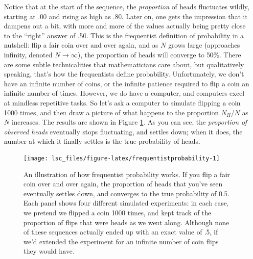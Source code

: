 \documentclass[
  11pt,
  a4paper,
  twoside,symmetric,openright]{book}
\theoremstyle{break}
\theoremstyle{break}
\begin{document}
Notice that at the start of the sequence, the \emph{proportion} of heads fluctuates wildly, starting at .00 and rising as high as .80. Later on, one gets the impression that it dampens out a bit, with more and more of the values actually being pretty close to the ``right'' answer of .50. This is the frequentist definition of probability in a nutshell: flip a fair coin over and over again, and as \(N\) grows large (approaches infinity, denoted \(N\rightarrow \infty\)), the proportion of heads will converge to 50\%. There are some subtle technicalities that mathematicians care about, but qualitatively speaking, that's how the frequentists define probability. Unfortunately, we don't have an infinite number of coins, or the infinite patience required to flip a coin an infinite number of times. However, we do have a computer, and computers excel at mindless repetitive tasks. So let's ask a computer to simulate flipping a coin 1000 times, and then draw a picture of what happens to the proportion \(N_H / N\) as \(N\) increases. The results are shown in Figure \ref{fig:frequentistprobability}. As you can see, the \emph{proportion of observed heads} eventually stops fluctuating, and settles down; when it does, the number at which it finally settles is the true probability of heads.

\begin{figure}

{\centering \texttt{[image: lsc\_files/figure-latex/frequentistprobability-1]} 

}

\caption{An illustration of how frequentist probability works. If you flip a fair coin over and over again, the proportion of heads that you've seen eventually settles down, and converges to the true probability of 0.5. Each panel shows four different simulated experiments: in each case, we pretend we flipped a coin 1000 times, and kept track of the proportion of flips that were heads as we went along. Although none of these sequences actually ended up with an exact value of .5, if we'd extended the experiment for an infinite number of coin flips they would have.}\label{fig:frequentistprobability}
\end{figure}
\end{document}
